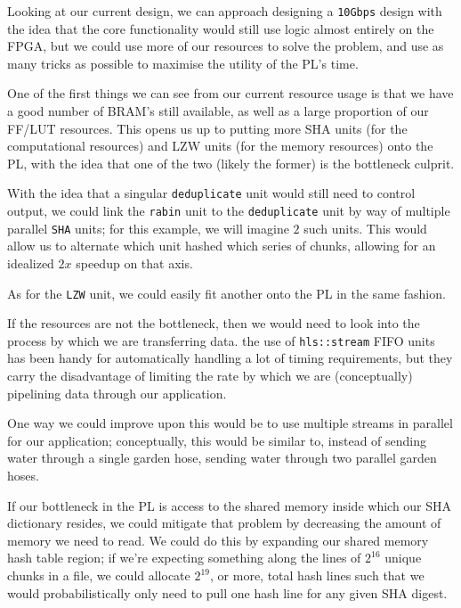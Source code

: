 \documentclass{article}
\begin{document}
Looking at our current design, we can approach designing a \texttt{10Gbps} design with the idea that the core functionality would still use logic almost entirely on the FPGA, but we could use more of our resources to solve the problem, and use as many tricks as possible to maximise the utility of the PL's time.
\newline\par
One of the first things we can see from our current resource usage is that we have a good number of BRAM's still available, as well as a large proportion of our FF/LUT resources.
This opens us up to putting more SHA units (for the computational resources) and LZW units (for the memory resources) onto the PL, with the idea that one of the two (likely the former) is the bottleneck culprit.
\par
With the idea that a singular \texttt{deduplicate} unit would still need to control output, we could link the \texttt{rabin} unit to the \texttt{deduplicate} unit by way of multiple parallel \texttt{SHA} units; for this example, we will imagine $2$ such units. This would allow us to alternate which unit hashed which series of chunks, allowing for an idealized $2x$ speedup on that axis.
\par
As for the \texttt{LZW} unit, we could easily fit another onto the PL in the same fashion.
\newline\par
If the resources are not the bottleneck, then we would need to look into the process by which we are transferring data. the use of \texttt{hls::stream} FIFO units has been handy for automatically handling a lot of timing requirements, but they carry the disadvantage of limiting the rate by which we are (conceptually) pipelining data through our application.
\par
One way we could improve upon this would be to use multiple streams in parallel for our application; conceptually, this would be similar to, instead of sending water through a single garden hose, sending water through two parallel garden hoses.
\par
If our bottleneck in the PL is access to the shared memory inside which our SHA dictionary resides, we could mitigate that problem by decreasing the amount of memory we need to read. We could do this by expanding our shared memory hash table region; if we're expecting something along the lines of $2^{16}$ unique chunks in a file, we could allocate $2^{19}$, or more, total hash lines such that we would probabilistically only need to pull one hash line for any given SHA digest.
\end{document}
